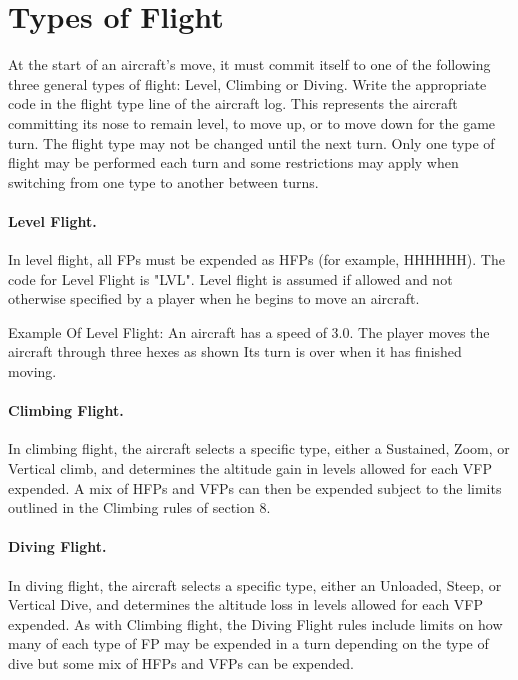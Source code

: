 \section{Types of Flight}

At the start of an aircraft's move, it must commit itself to one of the following three general types of flight: Level, Climbing or Diving. Write the appropriate code in the flight type line of the aircraft log. This represents the aircraft committing its nose to remain level, to move up, or to move down for the game turn. The flight type may not be changed until the next turn. Only one type of flight may be performed each turn and some restrictions may apply when switching from one type to another between turns.

\paragraph{Level Flight.} 
In level flight, all FPs must be expended as HFPs (for example, HHHHHH). The code for Level Flight is "LVL". Level flight is assumed if allowed and not otherwise specified by a player when he begins to move an aircraft.

Example Of Level Flight: An aircraft has a speed of 3.0. The player moves the aircraft through three hexes as shown  Its turn is over when it has finished moving.


\paragraph{Climbing Flight.} 
In climbing flight, the aircraft selects a specific type, either a Sustained, Zoom, or Vertical climb, and determines the altitude gain in levels allowed for each VFP expended. A mix of HFPs and VFPs can then be expended subject to the limits outlined in the Climbing rules of section 8.

\paragraph{Diving Flight.} 
In diving flight, the aircraft selects a specific type, either an Unloaded, Steep, or Vertical Dive, and determines the altitude loss in levels allowed for each VFP expended. As with Climbing flight, the Diving Flight rules include limits on how many of each type of FP may be expended in a turn depending on the type of dive but some mix of HFPs and VFPs can be expended.

